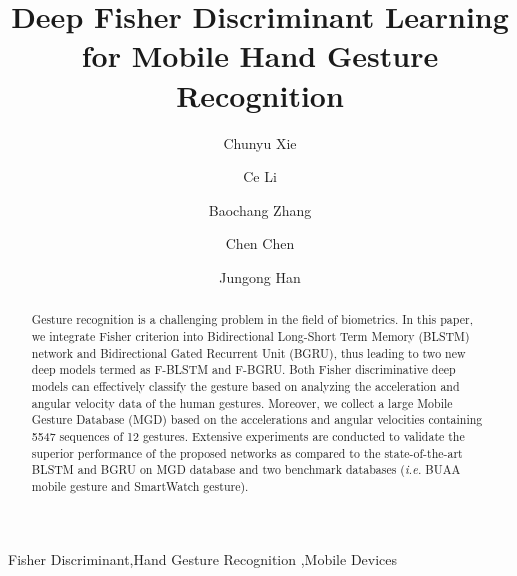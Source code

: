 \documentclass[review]{elsarticle}
\begin{document}
\begin{frontmatter}
\title{Deep Fisher Discriminant Learning for Mobile Hand Gesture Recognition}

\author[mymainaddress]{Chunyu Xie}%

\author[mysecondaryaddress]{Ce Li}

\author[mymainaddress]{Baochang Zhang}

\author[mythirdaddress]{Chen Chen}
\author[myfourthaddress]{Jungong Han}

\address[mymainaddress]{Department of Automation, Beihang University, Beijing, China}
\address[mysecondaryaddress]{Department of Computer Science, China University of Mining and Technology, Beijing, China}
\address[mythirdaddress]{University of Central Florida, Orlando, FL, USA.}
\address[myfourthaddress]{Nortumbria Univesity, Newcastle, UK.}

\begin{abstract}
Gesture recognition is a challenging problem in the field of biometrics. In this paper, we integrate Fisher criterion into Bidirectional Long-Short Term Memory (BLSTM) network and Bidirectional Gated Recurrent Unit (BGRU), thus leading to two new deep models termed as F-BLSTM and F-BGRU. Both Fisher discriminative deep models can effectively classify the gesture based on analyzing the acceleration and angular velocity data of the human gestures. Moreover, we collect a large Mobile Gesture Database (MGD) based on the accelerations and angular velocities containing 5547 sequences of 12 gestures. Extensive experiments are conducted to validate the superior performance of the proposed networks as compared to the state-of-the-art BLSTM and BGRU on MGD database and two benchmark databases (\emph{i.e.} BUAA mobile gesture and SmartWatch gesture).
\end{abstract}

\begin{keyword}
Fisher Discriminant\sep Hand Gesture Recognition \sep Mobile Devices
\end{keyword}

\end{frontmatter}
\end{document}
